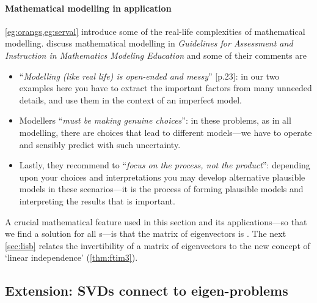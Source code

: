 \paragraph{Mathematical modelling in application}
\cref{eg:orangs,eg:serval} introduce some of the real-life complexities of mathematical modelling.
\cite{gaimme2016} discuss mathematical modelling in \emph{Guidelines for Assessment and Instruction in Mathematics Modeling Education} and some of their comments are 
\begin{itemize}
\item ``\emph{Modelling (like real life) is open-ended and messy}'' [p.23]: in our two examples here you have to extract the important factors from many unneeded details, and use them in the context of an imperfect model.
\item Modellers ``\emph{must be making genuine choices}'': in these problems, as in all modelling, there are choices that lead to different models---we have to operate and sensibly predict with such uncertainty.
\item Lastly, they recommend to ``\emph{focus on the process, not the product}'': depending upon your choices and interpretations you may develop alternative plausible models in these scenarios---it is the process of forming plausible models and interpreting the results that is important.
\end{itemize}





A crucial mathematical feature used in this section and its applications---so that we find a solution for all s---is that the matrix of eigenvectors is .
The next \cref{sec:lisb} relates the invertibility of a matrix of eigenvectors to the new concept of `linear independence' (\cref{thm:ftim3}).

\subsection{Extension: SVDs connect to eigen-problems}

